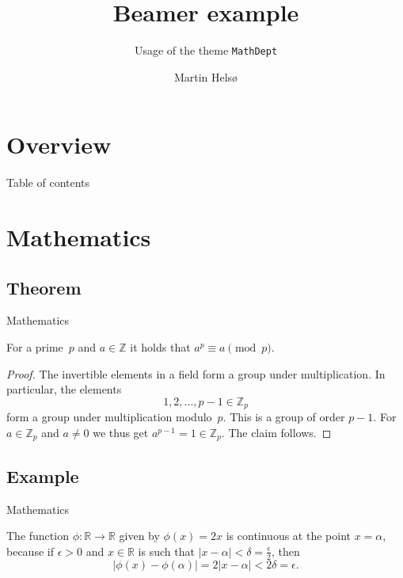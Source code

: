 \documentclass[UKenglish]{beamer}
\author{Martin Helsø}
\title{Beamer example}
\subtitle{Usage of the theme \texttt{MathDept}}
\begin{document}
\section{Overview}


%
%
\begin{frame}{Table of contents}
    \tableofcontents[currentsection]
\end{frame}


\section{Mathematics}
\subsection{Theorem}


\begin{frame}{Mathematics}
    \begin{theorem}
        For a prime~\(p\) and \(a \in \mathbb{Z}\) it holds that \(a^p \equiv a \pmod{p}\).
    \end{theorem}
    
    \begin{proof}
        The invertible elements in a field form a group under multiplication.
        In particular, the elements
        \begin{equation*}
            1, 2, \ldots, p - 1 \in \mathbb{Z}_p
        \end{equation*}
        form a group under multiplication modulo~\(p\).
        This is a group of order \(p - 1\).
        For \(a \in \mathbb{Z}_p\) and \(a \neq 0\) we thus get \(a^{p-1} = 1 \in \mathbb{Z}_p\).
        The claim follows.
    \end{proof}
\end{frame}


\subsection{Example}


\begin{frame}{Mathematics}
    \begin{example}
        The function \(\phi \colon \mathbb{R} \to \mathbb{R}\) given by \(\phi(x) = 2x\) is continuous at the point \(x = \alpha\),
        because if \(\epsilon > 0\) and \(x \in \mathbb{R}\) is such that \(\lvert x - \alpha \rvert < \delta = \frac{\epsilon}{2}\),
        then
        \begin{equation*}
            \lvert \phi(x) - \phi(\alpha)\rvert = 2\lvert x - \alpha \rvert < 2\delta = \epsilon.
        \end{equation*}
    \end{example}
\end{frame}
\end{document}
